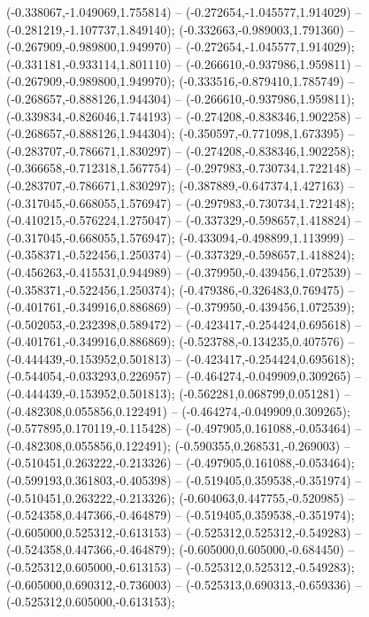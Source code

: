  (-0.338067,-1.049069,1.755814) -- (-0.272654,-1.045577,1.914029) -- (-0.281219,-1.107737,1.849140);
 (-0.332663,-0.989003,1.791360) -- (-0.267909,-0.989800,1.949970) -- (-0.272654,-1.045577,1.914029);
 (-0.331181,-0.933114,1.801110) -- (-0.266610,-0.937986,1.959811) -- (-0.267909,-0.989800,1.949970);
 (-0.333516,-0.879410,1.785749) -- (-0.268657,-0.888126,1.944304) -- (-0.266610,-0.937986,1.959811);
 (-0.339834,-0.826046,1.744193) -- (-0.274208,-0.838346,1.902258) -- (-0.268657,-0.888126,1.944304);
 (-0.350597,-0.771098,1.673395) -- (-0.283707,-0.786671,1.830297) -- (-0.274208,-0.838346,1.902258);
 (-0.366658,-0.712318,1.567754) -- (-0.297983,-0.730734,1.722148) -- (-0.283707,-0.786671,1.830297);
 (-0.387889,-0.647374,1.427163) -- (-0.317045,-0.668055,1.576947) -- (-0.297983,-0.730734,1.722148);
 (-0.410215,-0.576224,1.275047) -- (-0.337329,-0.598657,1.418824) -- (-0.317045,-0.668055,1.576947);
 (-0.433094,-0.498899,1.113999) -- (-0.358371,-0.522456,1.250374) -- (-0.337329,-0.598657,1.418824);
 (-0.456263,-0.415531,0.944989) -- (-0.379950,-0.439456,1.072539) -- (-0.358371,-0.522456,1.250374);
 (-0.479386,-0.326483,0.769475) -- (-0.401761,-0.349916,0.886869) -- (-0.379950,-0.439456,1.072539);
 (-0.502053,-0.232398,0.589472) -- (-0.423417,-0.254424,0.695618) -- (-0.401761,-0.349916,0.886869);
 (-0.523788,-0.134235,0.407576) -- (-0.444439,-0.153952,0.501813) -- (-0.423417,-0.254424,0.695618);
 (-0.544054,-0.033293,0.226957) -- (-0.464274,-0.049909,0.309265) -- (-0.444439,-0.153952,0.501813);
 (-0.562281,0.068799,0.051281) -- (-0.482308,0.055856,0.122491) -- (-0.464274,-0.049909,0.309265);
 (-0.577895,0.170119,-0.115428) -- (-0.497905,0.161088,-0.053464) -- (-0.482308,0.055856,0.122491);
 (-0.590355,0.268531,-0.269003) -- (-0.510451,0.263222,-0.213326) -- (-0.497905,0.161088,-0.053464);
 (-0.599193,0.361803,-0.405398) -- (-0.519405,0.359538,-0.351974) -- (-0.510451,0.263222,-0.213326);
 (-0.604063,0.447755,-0.520985) -- (-0.524358,0.447366,-0.464879) -- (-0.519405,0.359538,-0.351974);
 (-0.605000,0.525312,-0.613153) -- (-0.525312,0.525312,-0.549283) -- (-0.524358,0.447366,-0.464879);
 (-0.605000,0.605000,-0.684450) -- (-0.525312,0.605000,-0.613153) -- (-0.525312,0.525312,-0.549283);
 (-0.605000,0.690312,-0.736003) -- (-0.525313,0.690313,-0.659336) -- (-0.525312,0.605000,-0.613153);
